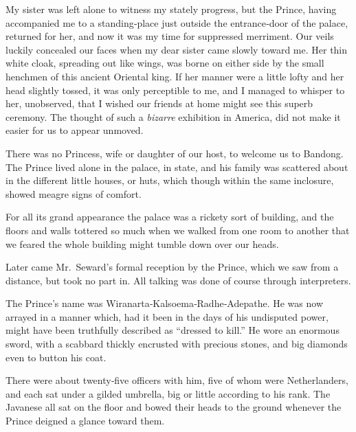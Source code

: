 \documentclass[12pt]{book}
\begin{document}
My sister was left alone to witness my stately progress, but the Prince, having
accompanied me to a standing‐place just outside the entrance‐door of the palace,
returned for her, and now it was my time for suppressed merriment. Our veils
luckily concealed our faces when my dear sister came slowly toward me. Her
thin white cloak, spreading out like wings, was borne on either side by the small
henchmen of this ancient Oriental king. If her manner were a little lofty and her
head slightly tossed, it was only perceptible to me, and I managed to whisper to
her, unobserved, that I wished our friends at home might see this superb ceremony.
The thought of such a \emph{bizarre} exhibition in America, did not make it easier for us
to appear unmoved.

There was no Princess, wife or daughter of our host, to welcome us to Bandong.
The Prince lived alone in the palace, in state, and his family was scattered about
in the different little houses, or huts, which though within the same inclosure,
showed meagre signs of comfort.

For all its grand appearance the palace was a rickety sort of building, and the
floors and walls tottered so much when we walked from one room to another
that we feared the whole building might tumble down over our heads.

Later came Mr.~Seward’s formal reception by the Prince, which we saw from a
distance, but took no part in. All talking was done of course through interpreters.

The Prince’s name was Wiranarta‐Kalsoema‐Radhe‐Adepathe. He was now
arrayed in a manner which, had it been in the days of his undisputed power,
might have been truthfully described as “dressed to kill.” He wore an enormous
sword, with a scabbard thickly encrusted with precious stones, and big diamonds
even to button his coat.

There were about twenty‐five officers with him, five of whom were Netherlanders, and each sat under a gilded umbrella, big or little according to his rank.
The Javanese all sat on the floor and bowed their heads to the ground whenever
the Prince deigned a glance toward them.
\end{document}
